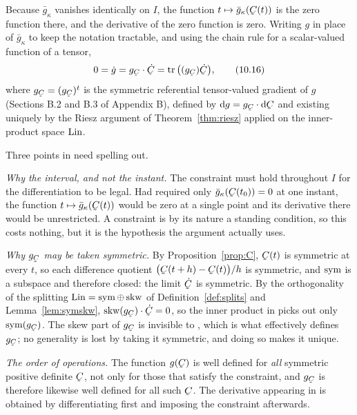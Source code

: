 Because $\bar g_{\kappa}$ vanishes identically on $I$, the function
$t\mapsto\bar g_{\kappa}(\bC(t))$ is the zero function there, and the
derivative of the zero function is zero. Writing $g$ in place of
$\bar g_{\kappa}$ to keep the notation tractable, and using the chain
rule for a scalar-valued function of a tensor,
\begin{equation}
   0=\dot g=g_{\bC}\cdot\dot\bC=\tr\big((g_{\bC})\dot\bC\big),
   \tag{10.16}\label{eq:10.16}
\end{equation}
where $g_{\bC}=(g_{\bC})^{t}$ is the symmetric referential tensor-valued
gradient of $g$ (Sections B.2 and B.3 of Appendix B), defined by
$\dl g=g_{\bC}\cdot\dl\bC$ and existing uniquely by the Riesz argument of
Theorem~\ref{thm:riesz} applied on the inner-product space $\operatorname{Lin}$.

Three points in  need spelling out.

\emph{Why the interval, and not the instant.} The constraint must hold
throughout $I$ for the differentiation to be legal. Had 
required only $\bar g_{\kappa}(\bC(t_{0}))=0$ at one instant, the
function $t\mapsto\bar g_{\kappa}(\bC(t))$ would be zero at a single
point and its derivative there would be unrestricted. A constraint is by
its nature a standing condition, so this costs nothing, but it is the
hypothesis the argument actually uses.

\emph{Why $g_{\bC}$ may be taken symmetric.} By
Proposition~\ref{prop:C}, $\bC(t)$ is symmetric at every $t$, so each
difference quotient $\big(\bC(t+h)-\bC(t)\big)/h$ is symmetric, and
$\operatorname{sym}$ is a subspace and therefore closed: the limit $\dot\bC$ is
symmetric. By the orthogonality of the splitting
$\operatorname{Lin}=\operatorname{sym}\oplus\operatorname{skw}$ of Definition~\ref{def:splits} and
Lemma~\ref{lem:symskw}, $\Skw(g_{\bC})\cdot\dot\bC=0$, so the inner
product in  picks out only $\Sym(g_{\bC})$. The skew part of
$g_{\bC}$ is invisible to , which is what effectively defines
$g_{\bC}$; no generality is lost by taking it symmetric, and doing so
makes it unique.

\emph{The order of operations.} The function $g(\bC)$ is well defined for
\emph{all} symmetric positive definite $\bC$, not only for those that
satisfy the constraint, and $g_{\bC}$ is therefore likewise well defined
for all such $\bC$. The derivative appearing in  is obtained
by differentiating first and imposing the constraint afterwards.

